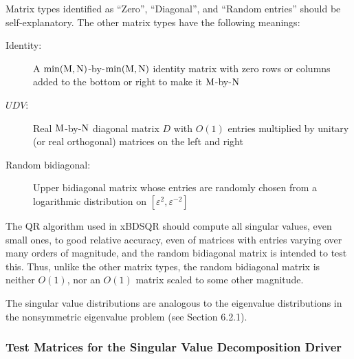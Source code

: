 Matrix types identified as ``Zero'', ``Diagonal'',
and ``Random entries'' should be self-explanatory.
The other matrix types have the following meanings:

\begin{description}
\item[{\rm Identity:}]  
A $\min({\rm M},{\rm N})$-by-$\min({\rm M},{\rm N})$
identity matrix with zero rows or columns added to the bottom
or right to make it ${\rm M}$-by-${\rm N}$

\item[$U D V$:]  
Real ${\rm M}$-by-${\rm N}$ diagonal matrix $D$ with
$O(1)$ entries multiplied by unitary (or real orthogonal) matrices
on the left and right

\item[{\rm Random bidiagonal:}] 
Upper bidiagonal matrix whose entries are randomly chosen
from a logarithmic distribution on $[ \varepsilon^2 , \varepsilon^{-2} ]$

\end{description}
The QR algorithm used in xBDSQR should compute all singular values,
even small ones, to good relative accuracy, even of matrices with
entries varying over many orders of magnitude, and the
random bidiagonal matrix is intended to test this.
Thus, unlike the other matrix types,
the random bidiagonal matrix is neither $O(1)$,
nor an $O(1)$ matrix scaled to some other magnitude.

The singular value distributions are analogous to the eigenvalue
distributions in the nonsymmetric eigenvalue problem (see Section 6.2.1).

\subsubsection{Test Matrices for the Singular Value Decomposition
Driver}

